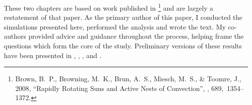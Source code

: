 These two chapters are based on work published in
\citet{Brown_et_al_2008}\footnote{{Brown}, B.~P., {Browning}, M.~K., {Brun}, A.~S., {Miesch}, M.~S., \& {Toomre},
  J., 2008, ``Rapidly Rotating Suns and Active Nests of Convection'', {\sl \apj}, {689},~1354--1372.}
and are largely a restatement of that paper.  As the primary author of
this paper, I conducted the simulations presented here, performed the
analysis and wrote the text.  My co-authors provided advice and
guidance throughout the process, helping frame the questions which
form the core of the study.  Preliminary versions of these results
have been presented in \cite{Brown_et_al_2004},
\cite{Brown_SPD_2006}, \cite{Brown_AAS_2007b}, and \cite{Brown_et_al_2007b}.

